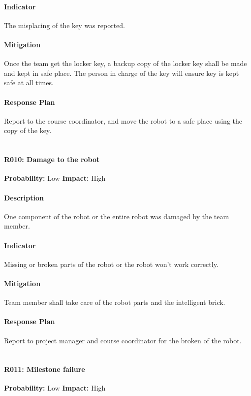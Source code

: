 \documentclass[11pt, a4paper]{report}
\begin{document}
	\paragraph{Indicator}The misplacing of the key was reported.
	\paragraph{Mitigation}Once the team get the locker key, a backup copy of the locker key shall be made and kept in safe place. The person in charge of the key will ensure key is kept safe at all times.
	\paragraph{Response Plan}Report to the course coordinator, and move the robot to a safe place using the copy of the key.\\\\

	\paragraph{R010: Damage to the robot} \hspace{1cm} \textbf{Probability: }Low\hspace{1cm}   \textbf{Impact: }High
	\paragraph{Description}One component of the robot or the entire robot was damaged by the team member.
	\paragraph{Indicator}Missing or broken parts of the robot or the robot won't work correctly.
	\paragraph{Mitigation}Team member shall take care of the robot parts and the intelligent brick.
	\paragraph{Response Plan}Report to project manager and course coordinator for the broken of the robot.\\\\

	\paragraph{R011: Milestone failure} \hspace{1cm} \textbf{Probability: }Low\hspace{1cm}   \textbf{Impact: }High
\end{document}
